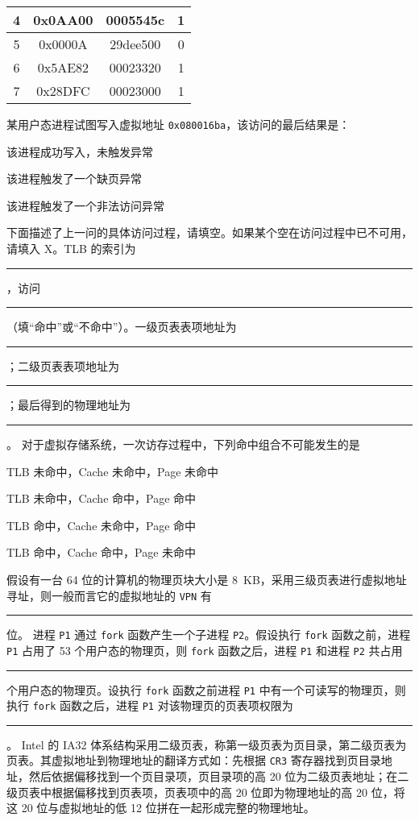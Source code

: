 \begin{problems}
\begin{table}[H]
\begin{tabular}{|c|c|c|c|}
                4 & 0x0AA00 & 0005545c & 1 \\ \hline
                5 & 0x0000A & 29dee500 & 0 \\ \hline
                6 & 0x5AE82 & 00023320 & 1 \\ \hline
                7 & 0x28DFC & 00023000 & 1 \\ \hline
            \end{tabular}
        \end{table}
        \qn 某用户态进程试图写入虚拟地址 \verb|0x080016ba|，该访问的最后结果是：
        \begin{choices}
            \item 该进程成功写入，未触发异常
            \item 该进程触发了一个缺页异常
            \item 该进程触发了一个非法访问异常
        \end{choices}
        \qn 下面描述了上一问的具体访问过程，请填空。如果某个空在访问过程中已不可用，请填入 X。TLB 的索引为 \rule{2.5cm}{0.25mm}，访问 \rule{2.5cm}{0.25mm}（填“命中”或“不命中”）。一级页表表项地址为 \rule{2.5cm}{0.25mm}；二级页表表项地址为 \rule{2.5cm}{0.25mm}；最后得到的物理地址为 \rule{2.5cm}{0.25mm}。
         对于虚拟存储系统，一次访存过程中，下列命中组合不可能发生的是
        \begin{choices}
            \item TLB 未命中，Cache 未命中，Page 未命中
            \item TLB 未命中，Cache 命中，Page 命中
            \item TLB 命中，Cache 未命中，Page 命中
            \item TLB 命中，Cache 命中，Page 未命中
        \end{choices}
         假设有一台 64 位的计算机的物理页块大小是 \SI{8}{KB}，采用三级页表进行虚拟地址寻址，则一般而言它的虚拟地址的 \verb|VPN| 有 \rule{2.5cm}{0.25mm} 位。
         进程 \verb|P1| 通过 \verb|fork| 函数产生一个子进程 \verb|P2|。假设执行 \verb|fork| 函数之前，进程 \verb|P1| 占用了 53 个用户态的物理页，则 \verb|fork| 函数之后，进程 \verb|P1| 和进程 \verb|P2| 共占用 \rule{2.5cm}{0.25mm} 个用户态的物理页。设执行 \verb|fork| 函数之前进程 \verb|P1| 中有一个可读写的物理页，则执行 \verb|fork| 函数之后，进程 \verb|P1| 对该物理页的页表项权限为 \rule{2.5cm}{0.25mm}。
         Intel 的 IA32 体系结构采用二级页表，称第一级页表为页目录，第二级页表为页表。其虚拟地址到物理地址的翻译方式如：先根据 \verb|CR3| 寄存器找到页目录地址，然后依据偏移找到一个页目录项，页目录项的高 20 位为二级页表地址；在二级页表中根据偏移找到页表项，页表项中的高 20 位即为物理地址的高 20 位，将这 20 位与虚拟地址的低 12 位拼在一起形成完整的物理地址。


\end{problems}
